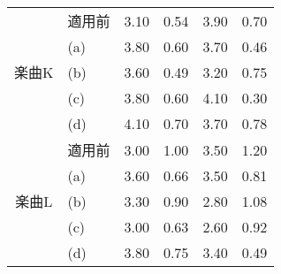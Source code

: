 \begin{table}[h]
\begin{tabular}{|c|l|r|r|r|r|}
      \multirow{5}{*}{楽曲K}  & 適用前 & 3.10  & 0.54  & 3.90  & 0.70 \\ \cline{2-6}
      & (a) & 3.80  & 0.60  & 3.70  & 0.46 \\ \cline{2-6}
      & (b) & 3.60  & 0.49  & 3.20  & 0.75 \\ \cline{2-6}
      & (c) & 3.80  & 0.60  & 4.10  & 0.30 \\ \cline{2-6}
      & (d) & 4.10  & 0.70  & 3.70  & 0.78 \\ \cline{1-6}

      \multirow{5}{*}{楽曲L}  & 適用前 & 3.00  & 1.00  & 3.50  & 1.20 \\ \cline{2-6}
      & (a) & 3.60  & 0.66  & 3.50  & 0.81 \\ \cline{2-6}
      & (b) & 3.30  & 0.90  & 2.80  & 1.08 \\ \cline{2-6}
      & (c) & 3.00  & 0.63  & 2.60  & 0.92 \\ \cline{2-6}
      & (d) & 3.80  & 0.75  & 3.40  & 0.49 \\ \cline{1-6}
  \end{tabular}
\end{table}